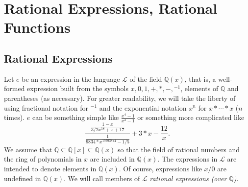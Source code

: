 \documentclass[fleqn]{llncs}
\newcommand{\QQ}{\ensuremath{\mathbb{Q}}}
\newcommand{\NRE}{\ensuremath{\mname{normRatExpr}}}
\newcommand{\Lang}{\ensuremath{\mathcal{L}}}
\begin{document}
\iffalse
syntax and semantics.  We have to be careful of \emph{which} semantics
is used to guide the syntactic manipulations, as different semantics
for the \textbf{same} expression can be inconsistent.

We are thus interested in the following questions:

\be

  \item What should the specification of the computational behavior of
    {\NRE} be?

  \item What is the mathematical meaning of {\NRE} be when {\NRE} is
    applied to the body of a rational function?

  \item What features of a logic are needed to express
    {\NRE}'s specification and mathematical meaning?

  \item What features of a logic would make expressing {\NRE}'s
    specification and mathematical meaning relatively straightforward?

\ee
\fi




\section{Rational Expressions, Rational Functions}

\subsection{Rational Expressions}

Let $e$ be an expression in the language $\Lang$ of the field
$\QQ(x)$, that is, a well-formed expression built from the symbols $x,
0, 1, +, *, -, \phantom{}^{-1}$, elements of $\QQ$ and parentheses (as
necessary).  For greater readability, we will take the liberty of
using fractional notation for $\phantom{}^{-1}$ and the exponential
notation $x^n$ for $x * \cdots * x$ ($n$ times).  $e$ can be something
simple like $\frac{x^4-1}{x^2-1}$ or something more complicated like
\begin{equation*}
\frac{\frac{1-x}{3/2 x^{18} + x + 17}}
     {\frac{1}{9834*x^{19393874}-1/5}}+3*x -\frac{12}{x}.
\end{equation*}
We assume that $\QQ \subseteq \QQ[x] \subseteq \QQ(x)$ so that the
field of rational numbers and the ring of polynomials in $x$ are
included in $\QQ(x)$.  The expressions in $\Lang$ are intended to
denote elements in $\QQ(x)$.  Of course, expressions like $x/0$ are
undefined in $\QQ(x)$.  We will call members of $\Lang$ \emph{rational
  expressions (over $\QQ$)}.
\end{document}
